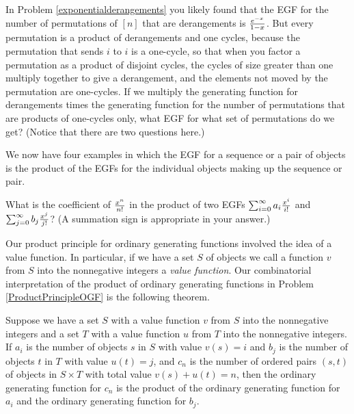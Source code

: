 In Problem \ref{exponentialderangements} you likely found that the
EGF for the number of permutations of $[n]$
that are derangements is $e^{-x}\over 1-x$.  But every permutation is a
product of derangements and one cycles, because the permutation that
sends $i$ to $i$ is a one-cycle, so that when you factor a permutation as
a product of disjoint cycles, the cycles of size greater than one
multiply together to give a derangement, and the elements not moved by
the permutation are one-cycles.  
\bp
\itemes If we multiply the generating function for derangements times the
generating function for the number of permutations that are products of
one-cycles only, what EGF for what set of permutations do
we get? (Notice that there are two questions
here.)\label{derangementsand1cycles}
\ep

We now have four examples in which the EGF
for a sequence or a pair of objects is the product of the EGFs for the
individual objects making up the sequence or pair.

\bp 
\itemes What is the coefficient of $x^n\over n!$ in the product of two
EGFs $\sum_{i=0}^\infty a_i{x^i\over i!}$ and $\sum_{j=0}^\infty
b_j{x^j\over j!}$? (A summation sign is appropriate in your
answer.)\label{exponentialpp1}
\ep

Our product principle for ordinary generating functions involved the idea
of a value function.  In particular, if we have a set $S$ of objects we
call a function $v$ from $S$ into the nonnegative
integers a {\em value function}.  Our combinatorial interpretation of the
product of ordinary generating functions in Problem
\ref{ProductPrincipleOGF} is the following theorem.

\begin{theorem} Suppose we have a set $S$ with a value function $v$ from
$S$ into the nonnegative integers and a set
$T$ with a value function
$u$
 from $T$ into the nonnegative integers.  If
$a_i$ is the number of objects $s$ in $S$ with value $v(s) =i$ and $b_j$
is the number of objects $t$ in $T$ with value $u(t)= j$, and $c_n$ is
the number of ordered pairs $(s,t)$ of objects in $S\times T$ with total
value $v(s) + u(t) =n$, then the ordinary  generating function for $c_n$
is the product of the ordinary generating function for $a_i$ and the
ordinary generating function for $b_j$. 
\end{theorem}


